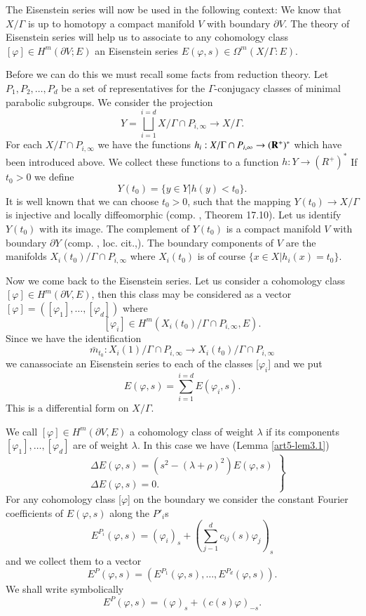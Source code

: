 The Eisenstein series will now be used in the following context: We know that $X/ \Gamma$ is up to homotopy a compact manifold $V$ with boundary $\partial V$. The theory of Eisenstein series will help us to associate to any cohomology class $[\varphi] \in H^m (\partial V; E)$ an Eisenstein series $E(\varphi, s) \in \Omega^m (X/\Gamma : E)$.

Before we can do this we must recall some facts from reduction theory. Let $P_1, P_2, \ldots, P_d$ be a set of representatives for the $\Gamma$-conjugacy classes of minimal parabolic subgroups. We consider the projection
$$
Y = \bigsqcup^{i=d}_{i=1} X / \Gamma \cap P_{i, \infty} \longrightarrow X / \Gamma.
$$
For each $X/ \Gamma \cap P_{i, \infty}$ we have the functions $h_i: X/ \Gamma \cap P_{i, \infty} \to (\mathbf{R}^+)^\ast$ which have been introduced above. We collect these functions to a function $h: Y \longrightarrow (R^+)^\ast$ If $t_0 > 0$ we define 
$$
Y(t_0) = \{y \in Y | h (y) < t_0\}.
$$
It is well known that we can choose $t_0 > 0$, such that the mapping $Y(t_0) \longrightarrow X/ \Gamma$ is injective and locally diffeomorphic (comp. \cite{art5-key2}, Theorem 17.10). Let us identify $Y(t_0)$ with its image. The complement of $Y(t_0)$ is a compact manifold $V$ with boundary $\partial Y$ (comp. \cite{art5-key2}, loc. cit.,). The boundary components of $V$ are the manifolds $X_i (t_0)/\Gamma \cap P_{i, \infty}$ where $X_i (t_0)$ is of course $\{x \in X | h_i  (x) = t_0\}$.

Now we come back to the Eisenstein series. Let us consider a cohomology class $[\varphi] \in H^m (\partial V, E)$, then this class may be considered as a vector $[\varphi] = ([\varphi_1], \ldots, [\varphi_d])$ where
$$
[\varphi_i] \in H^m (X_i (t_0) / \Gamma \cap P_{i, \infty}, E).
$$
Since we have the identification
$$
\bar{m}_{t_0} : X_i (1) / \Gamma \cap P_{i,\infty} \longrightarrow X_i (t_0) / \Gamma \cap P_{i, \infty}
$$
we can\pageoriginale associate an Eisenstein series to each of the classes [$\varphi_i$] and we put
$$
E(\varphi, s) = \sum\limits^{i=d}_{i=1} E (\varphi_i, s).
$$
This is a differential form on $X/ \Gamma$.

We call $[\varphi] \in H^m (\partial V, E)$ a cohomology class of weight $\lambda$ if its components $[\varphi_1], \ldots, [\varphi_d]$ are of weight $\lambda$. In this case we have (Lemma \ref{art5-lem3.1})
\begin{equation}
\left.
\begin{aligned}
& \Delta E (\varphi, s) = (s^2 - (\lambda + \rho)^2)E (\varphi, s)\\
& \Delta E (\varphi, s) = 0.
\end{aligned}
 \right\}\label{art5-eq3.3}
\end{equation}
For any cohomology class [$\varphi$] on the boundary we consider the constant Fourier coefficients of $E (\varphi, s)$ along the $P'_i$s
$$
E^{P_i} (\varphi, s) = (\varphi_i)_s + \left(\sum\limits^d_{j-1} c_{ij} (s) \varphi_j \right)_s
$$
and we collect them to a vector
$$
E^P(\varphi, s) = (E^{P_1} (\varphi, s), \ldots, E^{P_d} (\varphi, s)).
$$
We shall write symbolically
$$
E^P(\varphi, s) = (\varphi)_s + (c (s) \varphi)_{-s}.
$$

